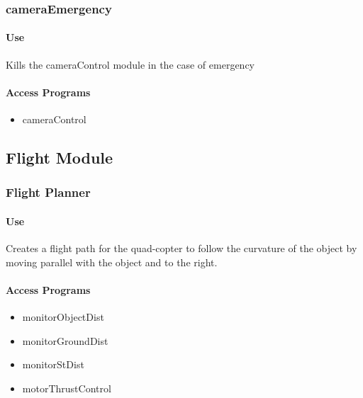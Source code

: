 \documentclass[10pt,letterpaper]{article}
\begin{document}
\subsubsection{cameraEmergency}
\paragraph{Use}
Kills the cameraControl module in the case of emergency
\paragraph{Access Programs}
\begin{itemize} 
\item cameraControl
\end{itemize}
\begin{table}[H]
  \caption{cameraEmergency}
\end{table}

\newpage

\subsection{Flight Module}

\subsubsection{Flight Planner}

\paragraph{Use}
Creates a flight path for the quad-copter to follow the curvature of the object by moving parallel with the object and to the right.

\paragraph{Access Programs}
\begin{itemize} 
\item monitorObjectDist
\item monitorGroundDist
\item monitorStDist
\item motorThrustControl
\end{itemize}
\end{document}
